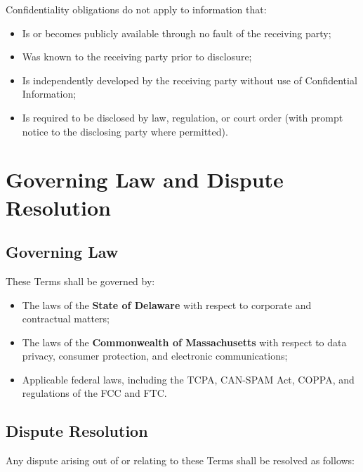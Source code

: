 \documentclass[11pt,letterpaper,parskip=half]{scrartcl}
\begin{document}
Confidentiality obligations do not apply to information that:

\begin{itemize}[nosep, leftmargin=1.5em]
    \item Is or becomes publicly available through no fault of the receiving party;
    \item Was known to the receiving party prior to disclosure;
    \item Is independently developed by the receiving party without use of Confidential Information;
    \item Is required to be disclosed by law, regulation, or court order (with prompt notice to the disclosing party where permitted).
\end{itemize}

\section{Governing Law and Dispute Resolution}

\subsection{Governing Law}

These Terms shall be governed by:

\begin{itemize}[nosep, leftmargin=1.5em]
    \item The laws of the \textbf{State of Delaware} with respect to corporate and contractual matters;
    \item The laws of the \textbf{Commonwealth of Massachusetts} with respect to data privacy, consumer protection, and electronic communications;
    \item Applicable federal laws, including the TCPA, CAN-SPAM Act, COPPA, and regulations of the FCC and FTC.
\end{itemize}

\subsection{Dispute Resolution}

Any dispute arising out of or relating to these Terms shall be resolved as follows:
\end{document}
